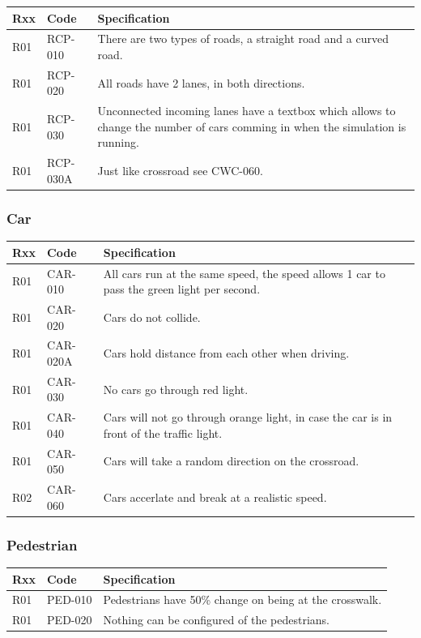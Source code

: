 \begin{tabularx}{\textwidth}{|p{0.5cm}p{2cm}X|}\hline
	Rxx & Code & Specification \\\hline
	R01 & RCP-010 & There are two types of roads, a straight road and a curved road.\\\hline
	R01 & RCP-020 & All roads have 2 lanes, in both directions.\\\hline
	R01 & RCP-030 & Unconnected incoming lanes have a textbox which allows to change the number of cars comming in when the simulation is running.\\\hline
	R01 & RCP-030A & Just like crossroad see CWC-060.\\\hline
\end{tabularx}

\subsubsection{Car}
\begin{tabularx}{\textwidth}{|p{0.5cm}p{2cm}X|}\hline
	Rxx & Code & Specification \\\hline
	R01 & CAR-010 & All cars run at the same speed, the speed allows 1 car to pass the green light per second.\\\hline
	R01 & CAR-020 & Cars do not collide.\\\hline
	R01 & CAR-020A & Cars hold distance from each other when driving.\\\hline
	R01 & CAR-030 & No cars go through red light.\\\hline
	R01 & CAR-040 & Cars will not go through orange light, in case the car is in front of the traffic light.\\\hline
	R01 & CAR-050 & Cars will take a random direction on the crossroad.\\\hline
	R02 & CAR-060 & Cars accerlate and break at a realistic speed.\\\hline
\end{tabularx}

\subsubsection{Pedestrian}
\begin{tabularx}{\textwidth}{|p{0.5cm}p{2cm}X|}\hline
	Rxx & Code & Specification \\\hline
	R01 & PED-010 & Pedestrians have 50\% change on being at the crosswalk.\\\hline
	R01 & PED-020 & Nothing can be configured of the pedestrians.\\\hline
\end{tabularx}


